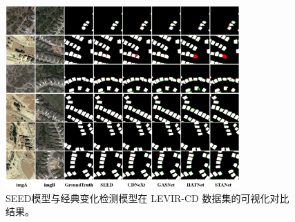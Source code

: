 \begin{figure}[!htbp]
  \centering
  \includegraphics[width=0.8\textwidth]{paper_figures/变化检测任务基础范式设计/seed_levir.png}
  \caption{SEED模型与经典变化检测模型在 LEVIR-CD 数据集的可视化对比结果。}
  \label{fig:seed_levir}
\end{figure}


